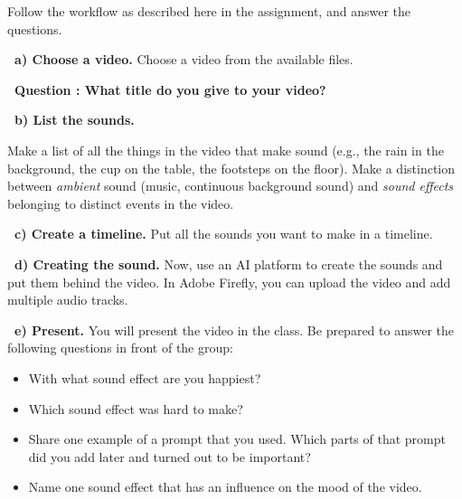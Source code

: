 \documentclass[12pt]{article}
\newcounter{question}
\newcommand{\question}[2][5cm]{%
  \stepcounter{question}
  \vspace{0.3cm}
  \textbf{\faEdit\ Question \thequestion: #2} \\[0.3em]
  
  \begin{Form}
  \TextField[
    name=Q\thequestion,
    multiline=true,
    width=\linewidth,
    height=#1,
    charsize=10pt,
    bordercolor={0 0 0},
    borderwidth=1.8,
    backgroundcolor={1 1 1}
  ]{}
  \end{Form}
  
  \vspace{0.3cm}
}
\begin{document}
Follow the workflow as described here in the assignment, and answer the questions. 

\vspace{0.3cm}
\textcolor{maincolor}{\textbf{\faPen\ a) Choose a video. }} 
Choose a video from the available files.

\question[2cm]{What title do you give to your video?}



\vspace{0.3cm}
\textcolor{maincolor}{\textbf{\faPen\ b) List the sounds.}} 

 Make a list of all the things in the video that make sound (e.g., the rain in the background, the cup on the table, the footsteps on the floor). Make a distinction between \emph{ambient} sound (music, continuous background sound) and \emph{sound effects} belonging to distinct events in the video.\\[0.3em]
\TextField[
  name=Q19,
  multiline=true,
  width=\linewidth,
  height=10cm,      %
  charsize=10pt,   %
  bordercolor={0 0 0},
  backgroundcolor={1 1 1}
]{}



\vspace{0.3cm}
\textcolor{maincolor}{\textbf{\faPen\ c) Create a timeline.}} 
Put all the sounds you want to make in a timeline. 

\TextField[
  name=Q20,
  multiline=true,
  width=\linewidth,
  height=5cm,      %
  charsize=10pt,   %
  bordercolor={0 0 0},
  backgroundcolor={1 1 1}
]{}


\vspace{0.3cm}
\textcolor{maincolor}{\textbf{\faPen\ d) Creating the sound. }}
Now, use an AI platform to create the sounds and put them behind the video. In Adobe Firefly, you can upload the video and add multiple audio tracks. 







\vspace{0.3cm}
\textcolor{maincolor}{\textbf{\faPen\ e) Present. }}
You will present the video in the class. Be prepared to answer the following questions in front of the group:
    \begin{itemize}
      \item With what sound effect are you happiest?
      \item Which sound effect was hard to make?
      \item Share one example of a prompt that you used. Which parts of that prompt did you add later and turned out to be important?
    \item Name one sound effect that has an influence on the mood of the video. 
    \end{itemize}
\end{document}
